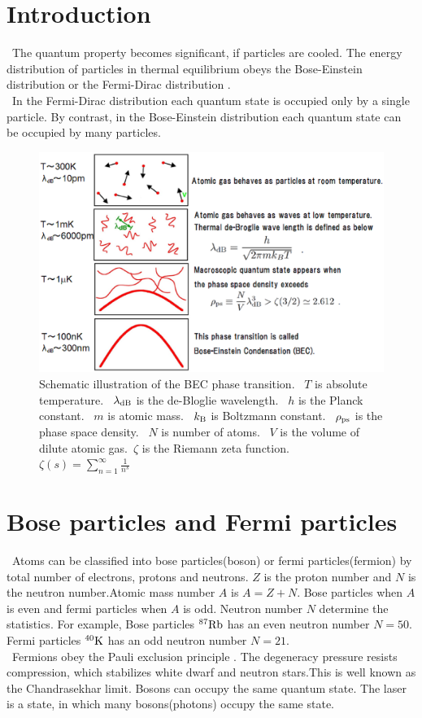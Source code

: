 \documentclass[12pt,a4paper]{report} %
\newcommand{\kb} {k_{\rm B}}				%
\begin{document}
\section {Introduction }
\ The quantum property becomes significant, if particles are cooled.
The energy distribution of particles in thermal equilibrium obeys
the Bose-Einstein distribution or the Fermi-Dirac distribution \cite{13}\cite{14}.
\\
\ In the Fermi-Dirac distribution each quantum state is occupied only by a single particle.
By contrast, in the Bose-Einstein distribution each quantum state can be occupied by many particles.
\begin{figure}[htbp]
\begin{center}
\includegraphics[scale=0.40, keepaspectratio]{2-1.eps}
\caption{
Schematic illustration of the BEC phase transition. \ $T$ is absolute temperature.
\ ${\lambda_{\rm dB}}$ is the de-Bloglie wavelength. \ $h$ is the Planck constant.
\ $m$ is atomic mass.
\ $\kb$ is Boltzmann constant. \ $\rho_{{\rm ps}}$ is the phase space density.
\ $N$ is number of atoms. \ $V$ is the volume of dilute atomic gas.\ $\zeta$ is the Riemann zeta function.
$\zeta(s)=\sum_{n=1}^\infty \frac{1}{n^s}$
}
\label{FIG:2-1}
\end{center}
\end{figure}

\section{Bose particles and Fermi particles}
\ Atoms can be classified into bose particles(boson) or fermi particles(fermion)
by total number of electrons, protons and neutrons.
$Z$ is the proton number and $N$ is the neutron number.Atomic mass number $A$ is
$A = Z + N$. Bose particles when $A$ is even and fermi particles when $A$ is odd.
Neutron number $N$ determine the statistics.
For example, Bose particles ${\rm ^{87}Rb}$ has an even neutron number $N = 50$.
Fermi particles ${\rm ^{40}K}$ has an odd neutron number $N = 21$.
\\
\ Fermions obey the Pauli exclusion principle \cite{15}.
The degeneracy pressure resists compression, which stabilizes white dwarf
and neutron stars.This is well known as the Chandrasekhar limit.
Bosons can occupy the same quantum state. The laser is a state, in which many bosons(photons)
occupy the same state.
\end{document}
